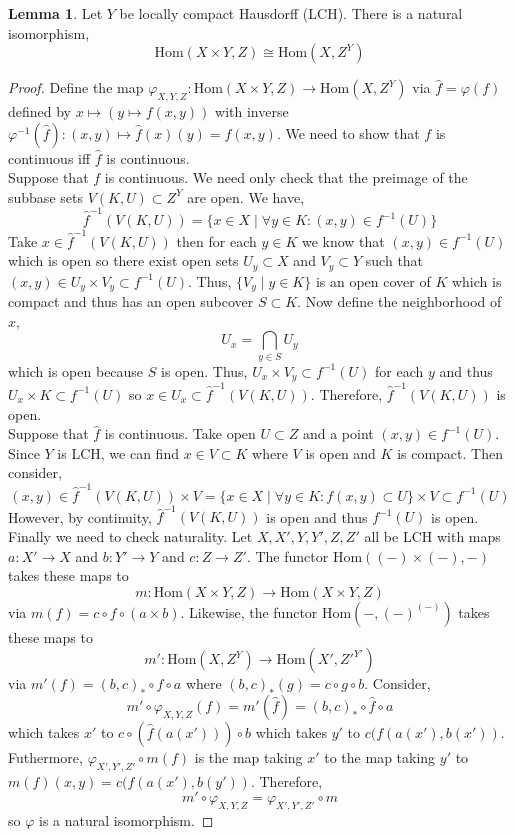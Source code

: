 \documentclass[12pt]{extarticle}
\newcommand{\Hom}[2]{\mathrm{Hom}\left( #1, #2 \right)}
\theoremstyle{definition}
\newtheorem{lemma}[theorem]{Lemma}
\begin{document}
\begin{lemma}
Let $Y$ be locally compact Hausdorff (LCH). There is a natural isomorphism,
\[\Hom{X \times Y}{Z} \cong \Hom{X}{Z^Y}\]
\end{lemma}

\begin{proof}
Define the map $\varphi_{X,Y,Z} : \Hom{X \times Y}{Z} \to \Hom{X}{Z^Y}$ via $\hat{f} = \varphi(f)$ defined by $x \mapsto (y \mapsto f(x, y))$ with inverse $\varphi^{-1}(\hat{f}) : (x, y) \mapsto \hat{f}(x)(y) = f(x, y)$. We need to show that $f$ is continuous iff $\hat{f}$ is continuous. 
\bigskip
\\
Suppose that $f$ is continuous. We need only check that the preimage of the subbase sets $V(K, U) \subset Z^Y$ are open. We have,
\[ \hat{f}^{-1}(V(K, U)) = \{ x \in X \mid \forall y \in K : (x, y) \in f^{-1}(U) \} \]
Take $x \in \hat{f}^{-1}(V(K, U))$ then for each $y \in K$ we know that $(x, y) \in f^{-1}(U)$ which is open so there exist open sets $U_y \subset X$ and $V_y \subset Y$ such that $(x, y) \in U_y \times V_y \subset f^{-1}(U)$. Thus, $\{ V_y \mid y \in K \}$ is an open cover of $K$ which is compact and thus has an open subcover $S \subset K$. Now define the neighborhood of $x$,
\[ U_x = \bigcap_{y \in S} U_y \]
which is open because $S$ is open. Thus, $U_x \times V_y \subset f^{-1}(U)$ for each $y$ and thus $U_x \times K \subset f^{-1}(U)$ so $x \in U_x \subset \hat{f}^{-1}(V(K, U))$. Therefore, $\hat{f}^{-1}(V(K, U))$ is open. 
\bigskip
\\
Suppose that $\hat{f}$ is continuous. Take open $U \subset Z$ and a point $(x, y) \in f^{-1}(U)$. Since $Y$ is LCH, we can find $x \in V \subset K$ where $V$ is open and $K$ is compact. Then consider,
\[ (x, y) \in \hat{f}^{-1}(V(K, U)) \times V = \{ x \in X \mid \forall y \in K : f(x, y) \subset U \} \times V \subset f^{-1}(U)  \]
However, by continuity, $\hat{f}^{-1}(V(K, U))$ is open and thus $f^{-1}(U)$ is open.
\bigskip
\\
Finally we need to check naturality. Let $X, X', Y, Y', Z, Z'$ all be LCH with maps $a : X' \to X$ and $b : Y' \to Y$ and $c : Z \to Z'$. The functor $\Hom{(-)\times(-)}{-}$ takes these maps to
\[m : \Hom{X \times Y}{Z} \to \Hom{X \times Y}{Z}\]
via $m(f) = c \circ f \circ (a \times b)$. Likewise, the functor $\Hom{-}{(-)^(-)}$ takes these maps to 
\[m' : \Hom{X}{Z^Y} \to \Hom{X'}{Z'^{Y'}}\]
via $m'(f) = (b, c)_* \circ f \circ a$ where $(b, c)_*(g) = c \circ g \circ b$. Consider, 
\[ m' \circ \varphi_{X, Y, Z}(f) = m'(\hat{f}) = (b, c)_* \circ \hat{f} \circ a \] which takes $x'$ to $c \circ (\hat{f}(a(x'))) \circ b$ which takes $y'$ to $c(f(a(x'), b(x'))$. Futhermore, $\varphi_{X', Y', Z'} \circ m(f)$ is the map taking $x'$ to the map taking $y'$ to $m(f)(x,y) = c(f(a(x'), b(y'))$. Therefore, 
\[ m' \circ \varphi_{X, Y, Z} = \varphi_{X', Y', Z'} \circ m \]
so $\varphi$ is a natural isomorphism. 
\end{proof}
\end{document}
